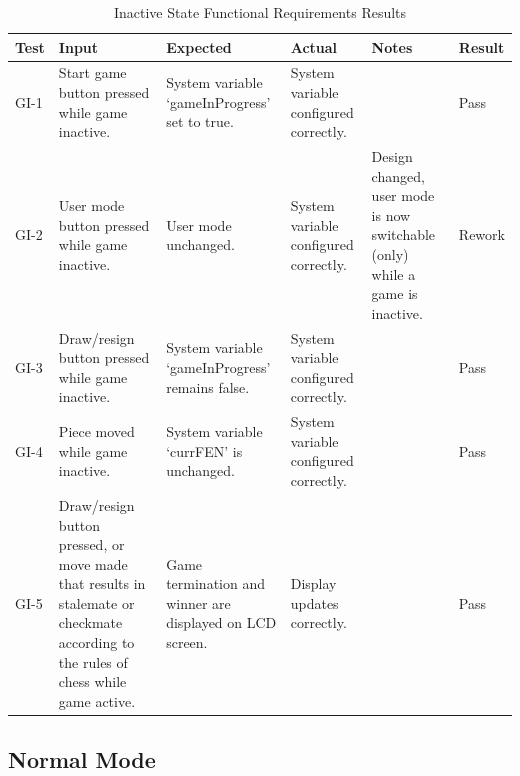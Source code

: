\documentclass[12pt, titlepage]{article}
\begin{document}
\begin{table}[H]
    \centering
        \setlength{\leftmargini}{0cm}
        \begin{tabular}{| >{\centering\arraybackslash}m{1cm} | 
            >{\centering\arraybackslash}m{2.5cm} | 
            >{\centering\arraybackslash}m{4cm} | 
            >{\centering\arraybackslash}m{3cm} |
            >{\centering\arraybackslash}m{3cm} |
            >{\centering\arraybackslash}m{1.5cm} |}
        \hline
        \rowcolor[gray]{0.9}
        Test & Input & Expected & Actual & Notes & Result\\
        \hline
        GI-1 & Start game button pressed while game inactive. & System variable `gameInProgress' set to true. & System variable configured correctly. &  & Pass \\
        \hline
        GI-2 & User mode button pressed while game inactive. & User mode unchanged. & System variable configured correctly. & Design changed, user mode is now switchable (only) while a game is inactive. & Rework \\
        \hline
        GI-3 & Draw/resign button pressed while game inactive. & System variable `gameInProgress' remains false. & System variable configured correctly. &  & Pass \\
        \hline
        GI-4 & Piece moved while game inactive. & System variable `currFEN' is unchanged. & System variable configured correctly. &  & Pass \\
        \hline
        GI-5 & Draw/resign button pressed, or move made that results in stalemate or checkmate according to the rules of chess while game active. & Game termination and winner are displayed on LCD screen. & Display updates correctly. &  & Pass \\
        \hline
        \end{tabular}
    \caption{Inactive State Functional Requirements Results}
\end{table}

\subsection{Normal Mode}
\end{document}
